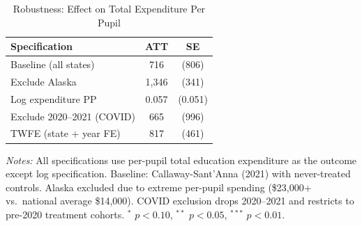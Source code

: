
\begin{table}[htbp]
\centering
\caption{Robustness: Effect on Total Expenditure Per Pupil}
\label{tab:robust}
\small
\begin{tabular}{lcc}
\hline\hline
Specification & ATT & SE \\
\hline
Baseline (all states) & 716 & (806) \\
Exclude Alaska & 1,346 & (341) \\
Log expenditure PP & 0.057 & (0.051) \\
Exclude 2020--2021 (COVID) & 665 & (996) \\
TWFE (state + year FE) & 817 & (461) \\
\hline\hline
\end{tabular}
\begin{tablenotes}
\small
\item \textit{Notes:} All specifications use per-pupil total education expenditure as the outcome except log specification. Baseline: Callaway-Sant'Anna (2021) with never-treated controls. Alaska excluded due to extreme per-pupil spending (\$23,000+ vs.~national average \$14,000). COVID exclusion drops 2020--2021 and restricts to pre-2020 treatment cohorts. $^{*}$ $p<0.10$, $^{**}$ $p<0.05$, $^{***}$ $p<0.01$.
\end{tablenotes}
\end{table}

